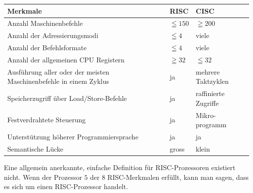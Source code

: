 \begin{table}[ht]
	\centering
	\begin{tabular}{ |p{10 cm} |p{2 cm}|p{4 cm}|}
		\hline				%
		\textbf{Merkmale} 	& 	\textbf{RISC}	& \textbf{CISC} \\
		\hline Anzahl Maschinenbefehle	& $\leqq 150$	& $\geqq 200$ \\
		Anzahl der Adressierungsmodi	& $\leqq 4$ 	& viele \\
		Anzahl der Befehlsformate 		& $\leqq 4$ 	& viele \\
		Anzahl der allgemeinen CPU Registern & $\geqq 32$ 	& $\leqq 32$ \\
		Ausführung aller oder der meisten Maschinenbefehle in einem Zyklus 		& ja 	& mehrere Taktzyklen \\	
		Speicherzugriff über Load/Store-Befehle & ja & raffinierte Zugriffe \\
		Festverdrahtete Steuerung		& ja	& Mikro-programm \\
		Unterstützung höherer Programmiersprache & ja 	& ja \\
		Semantische Lücke				& gross			& klein \\
		\hline
	\end{tabular} 

\end{table}

Eine allgemein anerkannte, einfache Definition für RISC-Prozessoren existiert nicht.
Wenn der Prozessor $5$ der $8$ RISC-Merkmalen erfüllt, kann man sagen, dass es sich um einen RISC-Prozessor handelt. 

